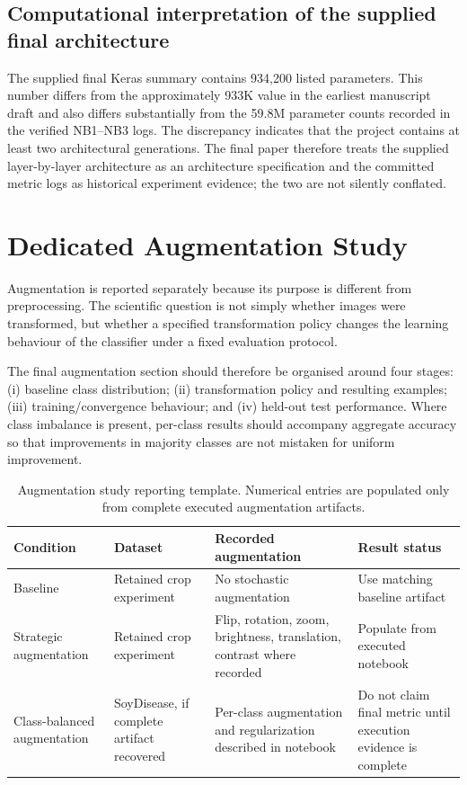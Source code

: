 \documentclass[a4paper,fleqn]{cas-dc}
\begin{document}
\subsection{Computational interpretation of the supplied final architecture}
The supplied final Keras summary contains 934,200 listed parameters. This number differs from the approximately 933K value in the earliest manuscript draft and also differs substantially from the 59.8M parameter counts recorded in the verified NB1--NB3 logs. The discrepancy indicates that the project contains at least two architectural generations. The final paper therefore treats the supplied layer-by-layer architecture as an architecture specification and the committed metric logs as historical experiment evidence; the two are not silently conflated.

\section{Dedicated Augmentation Study}
Augmentation is reported separately because its purpose is different from preprocessing. The scientific question is not simply whether images were transformed, but whether a specified transformation policy changes the learning behaviour of the classifier under a fixed evaluation protocol.

The final augmentation section should therefore be organised around four stages: (i) baseline class distribution; (ii) transformation policy and resulting examples; (iii) training/convergence behaviour; and (iv) held-out test performance. Where class imbalance is present, per-class results should accompany aggregate accuracy so that improvements in majority classes are not mistaken for uniform improvement.

\begin{table}[t]
\centering
\caption{Augmentation study reporting template. Numerical entries are populated only from complete executed augmentation artifacts.}
\label{tab:augmentation}
\small
\begin{tabularx}{\textwidth}{@{}l l X l@{}}
\toprule
Condition & Dataset & Recorded augmentation & Result status \\
\midrule
Baseline & Retained crop experiment & No stochastic augmentation & Use matching baseline artifact \\
Strategic augmentation & Retained crop experiment & Flip, rotation, zoom, brightness, translation, contrast where recorded & Populate from executed notebook \\
Class-balanced augmentation & SoyDisease, if complete artifact recovered & Per-class augmentation and regularization described in notebook & Do not claim final metric until execution evidence is complete \\
\bottomrule
\end{tabularx}
\end{table}
\end{document}

